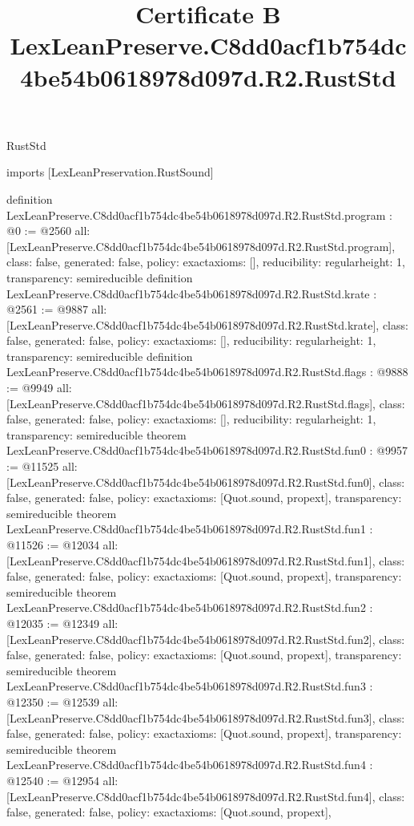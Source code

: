 \begin{lexlean}{RustStd}
\title{Certificate B LexLeanPreserve.C8dd0acf1b754dc4be54b0618978d097d.R2.RustStd}
\begin{coremodule}
imports [LexLeanPreservation.RustSound]

definition LexLeanPreserve.C8dd0acf1b754dc4be54b0618978d097d.R2.RustStd.program : @0 := @2560 {
  all: [LexLeanPreserve.C8dd0acf1b754dc4be54b0618978d097d.R2.RustStd.program],
  class: false,
  generated: false,
  policy: exact{axioms: []},
  reducibility: regular{height: 1},
  transparency: semireducible
}
definition LexLeanPreserve.C8dd0acf1b754dc4be54b0618978d097d.R2.RustStd.krate : @2561 := @9887 {
  all: [LexLeanPreserve.C8dd0acf1b754dc4be54b0618978d097d.R2.RustStd.krate],
  class: false,
  generated: false,
  policy: exact{axioms: []},
  reducibility: regular{height: 1},
  transparency: semireducible
}
definition LexLeanPreserve.C8dd0acf1b754dc4be54b0618978d097d.R2.RustStd.flags : @9888 := @9949 {
  all: [LexLeanPreserve.C8dd0acf1b754dc4be54b0618978d097d.R2.RustStd.flags],
  class: false,
  generated: false,
  policy: exact{axioms: []},
  reducibility: regular{height: 1},
  transparency: semireducible
}
theorem LexLeanPreserve.C8dd0acf1b754dc4be54b0618978d097d.R2.RustStd.fun0 : @9957 := @11525 {
  all: [LexLeanPreserve.C8dd0acf1b754dc4be54b0618978d097d.R2.RustStd.fun0],
  class: false,
  generated: false,
  policy: exact{axioms: [Quot.sound, propext]},
  transparency: semireducible
}
theorem LexLeanPreserve.C8dd0acf1b754dc4be54b0618978d097d.R2.RustStd.fun1 : @11526 := @12034 {
  all: [LexLeanPreserve.C8dd0acf1b754dc4be54b0618978d097d.R2.RustStd.fun1],
  class: false,
  generated: false,
  policy: exact{axioms: [Quot.sound, propext]},
  transparency: semireducible
}
theorem LexLeanPreserve.C8dd0acf1b754dc4be54b0618978d097d.R2.RustStd.fun2 : @12035 := @12349 {
  all: [LexLeanPreserve.C8dd0acf1b754dc4be54b0618978d097d.R2.RustStd.fun2],
  class: false,
  generated: false,
  policy: exact{axioms: [Quot.sound, propext]},
  transparency: semireducible
}
theorem LexLeanPreserve.C8dd0acf1b754dc4be54b0618978d097d.R2.RustStd.fun3 : @12350 := @12539 {
  all: [LexLeanPreserve.C8dd0acf1b754dc4be54b0618978d097d.R2.RustStd.fun3],
  class: false,
  generated: false,
  policy: exact{axioms: [Quot.sound, propext]},
  transparency: semireducible
}
theorem LexLeanPreserve.C8dd0acf1b754dc4be54b0618978d097d.R2.RustStd.fun4 : @12540 := @12954 {
  all: [LexLeanPreserve.C8dd0acf1b754dc4be54b0618978d097d.R2.RustStd.fun4],
  class: false,
  generated: false,
  policy: exact{axioms: [Quot.sound, propext]},
}
\end{coremodule}
\end{lexlean}
